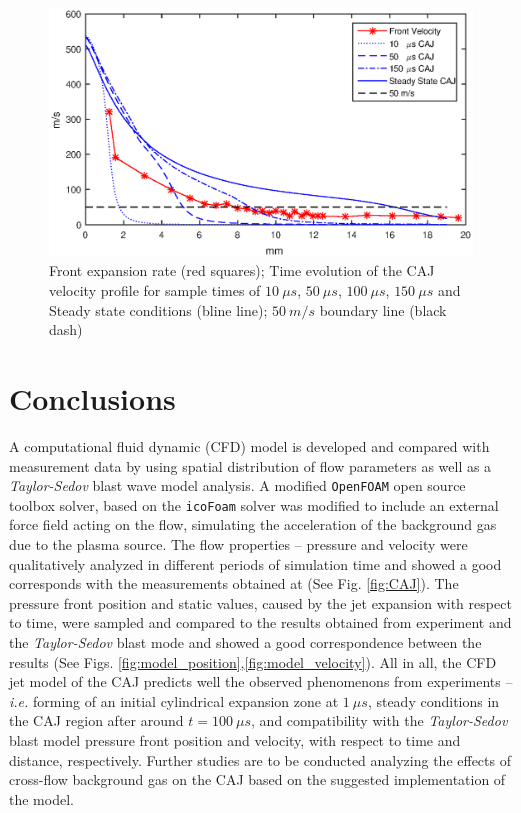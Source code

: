 \documentclass[a4paper]{iacas}%
\begin{document}
\begin{figure}
	\includegraphics[width=\textwidth]{Vel_Times.eps}
	\caption{Front expansion rate (red squares); Time evolution of the CAJ velocity profile for sample times of $10~\mu s$, $50~\mu s$, $100~\mu s$, $150~\mu s$ and Steady state conditions (bline line); $50~m/s$ boundary line (black dash) }
	\label{fig:model_caj_velocity}
\end{figure}

\section{Conclusions}
A computational fluid dynamic (CFD) model is developed and compared with measurement data by using spatial distribution of flow parameters as well as a \emph{Taylor-Sedov} blast wave model analysis.
A modified \texttt{OpenFOAM} open source toolbox solver, based on the \texttt{icoFoam} solver was modified to include an external force field acting on the flow, simulating the acceleration of the background gas due to the plasma source.
The flow properties -- pressure and velocity were qualitatively analyzed in different periods of simulation time and showed a good corresponds with the measurements obtained at \cite{KR,KRClose,KRFar} (See Fig. \ref{fig:CAJ}). The pressure front position and static values, caused by the jet expansion with respect to time, were sampled and compared to the results obtained from experiment and the \emph{Taylor-Sedov} blast mode and showed a good correspondence between the results (See Figs. \ref{fig:model_position},\ref{fig:model_velocity}).
All in all, the CFD jet model of the CAJ predicts well the observed phenomenons from experiments -- \emph{i.e.} forming of an initial cylindrical expansion zone at $1~\mu s$, steady conditions in the CAJ region after around $t = 100~\mu s$, and compatibility with the \emph{Taylor-Sedov} blast model pressure front position and velocity, with respect to time and distance, respectively. Further studies are to be conducted analyzing the effects of cross-flow background gas \cite{KRClose} on the CAJ based on the suggested implementation of the model.

\clearpage


\end{document}
